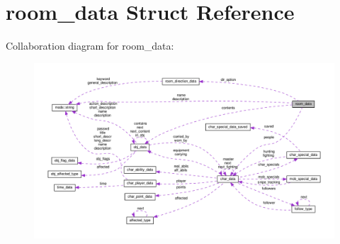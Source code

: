 \hypertarget{structroom__data}{}\section{room\+\_\+data Struct Reference}
\label{structroom__data}


Collaboration diagram for room\+\_\+data\+:
\nopagebreak
\begin{figure}[H]
\begin{center}
\leavevmode
\includegraphics[width=350pt]{structroom__data__coll__graph}
\end{center}
\end{figure}
